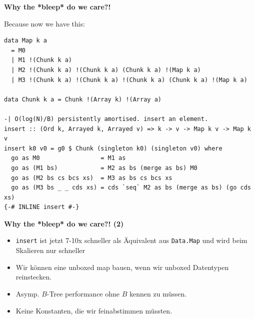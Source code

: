 \documentclass{beamer}
\begin{document}

\begin{frame}[fragile]

\textbf{Why the *bleep* do we care?!}
\pause
\bigskip

Because now we have this:

\begin{verbatim}
data Map k a
  = M0 
  | M1 !(Chunk k a) 
  | M2 !(Chunk k a) !(Chunk k a) (Chunk k a) !(Map k a)
  | M3 !(Chunk k a) !(Chunk k a) !(Chunk k a) (Chunk k a) !(Map k a)
  
data Chunk k a = Chunk !(Array k) !(Array a)

-| O(log(N)/B) persistently amortised. insert an element.
insert :: (Ord k, Arrayed k, Arrayed v) => k -> v -> Map k v -> Map k v
insert k0 v0 = g0 $ Chunk (singleton k0) (singleton v0) where
  go as M0                 = M1 as
  go as (M1 bs)            = M2 as bs (merge as bs) M0
  go as (M2 bs cs bcs xs)  = M3 as bs cs bcs xs
  go as (M3 bs _ _ cds xs) = cds `seq` M2 as bs (merge as bs) (go cds xs)
{-# INLINE insert #-}
\end{verbatim}

\end{frame}

\begin{frame}
\textbf{Why the *bleep* do we care?! (2)}
\pause
\bigskip

\begin{itemize}
\item \texttt{insert} ist jetzt 7-10x schneller als Äquivalent aus \texttt{Data.Map} und wird beim Skalieren nur schneller\pause
\item Wir können eine unboxed map bauen, wenn wir unboxed Datentypen reinstecken.\pause
\item Asymp. $B$-Tree performance ohne $B$ kennen zu müssen.\pause
\item Keine Konstanten, die wir feinabstimmen müssten.
\end{itemize}
\end{frame}

\end{document}
